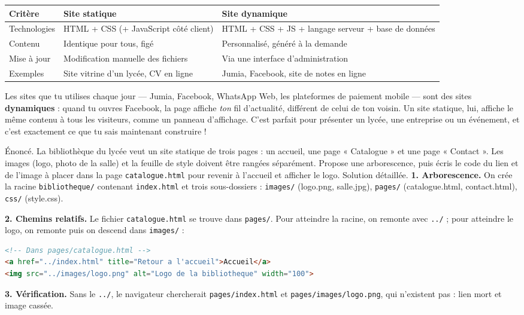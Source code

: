 \documentclass[11pt]{article}
\begin{document}
\begin{center}
\begin{tabularx}{\linewidth}{|l|X|X|}
\hline
\rowcolor{popblueL} \textbf{Critère} & \textbf{Site statique} & \textbf{Site dynamique} \\
\hline
Technologies & HTML + CSS (+ JavaScript côté client) & HTML + CSS + JS + langage serveur + base de données \\
\hline
Contenu & Identique pour tous, figé & Personnalisé, généré à la demande \\
\hline
Mise à jour & Modification manuelle des fichiers & Via une interface d'administration \\
\hline
Exemples & Site vitrine d'un lycée, CV en ligne & Jumia, Facebook, site de notes en ligne \\
\hline
\end{tabularx}
\end{center}

\begin{savaistu}
Les sites que tu utilises chaque jour — Jumia, Facebook, WhatsApp Web, les plateformes de paiement mobile — sont des sites \textbf{dynamiques} : quand tu ouvres Facebook, la page affiche \emph{ton} fil d'actualité, différent de celui de ton voisin. Un site statique, lui, affiche le même contenu à tous les visiteurs, comme un panneau d'affichage. C'est parfait pour présenter un lycée, une entreprise ou un événement, et c'est exactement ce que tu sais maintenant construire !
\end{savaistu}

\begin{exoresolu}
Énoncé. La bibliothèque du lycée veut un site statique de trois pages : un accueil, une page « Catalogue » et une page « Contact ». Les images (logo, photo de la salle) et la feuille de style doivent être rangées séparément. Propose une arborescence, puis écris le code du lien et de l'image à placer dans la page \texttt{catalogue.html} pour revenir à l'accueil et afficher le logo.
\tcblower
Solution détaillée.
\textbf{1. Arborescence.} On crée la racine \texttt{bibliotheque/} contenant \texttt{index.html} et trois sous-dossiers : \texttt{images/} (logo.png, salle.jpg), \texttt{pages/} (catalogue.html, contact.html), \texttt{css/} (style.css).

\textbf{2. Chemins relatifs.} Le fichier \texttt{catalogue.html} se trouve dans \texttt{pages/}. Pour atteindre la racine, on remonte avec \texttt{../} ; pour atteindre le logo, on remonte puis on descend dans \texttt{images/} :
\begin{lstlisting}[language=HTML]
<!-- Dans pages/catalogue.html -->
<a href="../index.html" title="Retour a l'accueil">Accueil</a>
<img src="../images/logo.png" alt="Logo de la bibliotheque" width="100">
\end{lstlisting}
\textbf{3. Vérification.} Sans le \texttt{../}, le navigateur chercherait \texttt{pages/index.html} et \texttt{pages/images/logo.png}, qui n'existent pas : lien mort et image cassée.
\end{exoresolu}
\end{document}
